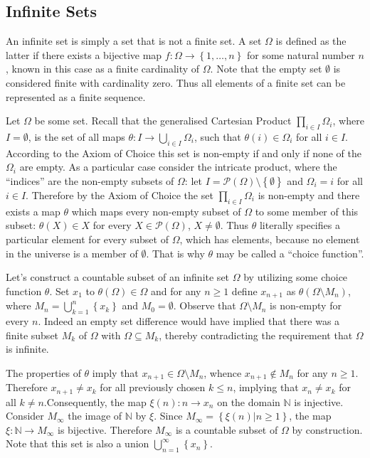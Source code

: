 \documentclass[a4paper]{article}
\newcommand{\obj}[1]{\left\{{#1}\right\}}
\newcommand{\brac}[1]{{\left({#1}\right)}}
\begin{document}


\subsection{Infinite Sets} %
\label{sub:infinite_sets}
An infinite set is simply a set that is not a finite set. A set $\Omega$ is defined as the latter if there exists a bijective map $f:\Omega\to\obj{1,\ldots, n}$ for some natural number $n$, known in this case as a finite cardinality of $\Omega$. Note that the empty set $\emptyset$ is considered finite with cardinality zero. Thus all elements of a finite set can be represented as a finite sequence.

Let $\Omega$ be some set. Recall that the generalised Cartesian Product $\prod_{i\in I}\Omega_i$, where $I=\emptyset$, is the set of all maps $\theta:I\to \bigcup_{i\in I}\Omega_i$, such that $\theta(i)\in \Omega_i$ for all $i\in I$. According to the Axiom of Choice this set is non-empty if and only if none of the $\Omega_i$ are empty. As a particular case consider the intricate product, where the ``indices'' are the non-empty subsets of $\Omega$: let $I = \mathcal{P}\brac{\Omega}\setminus\obj{\emptyset}$ and $\Omega_i=i$ for all $i\in I$. Therefore by the Axiom of Choice the set $\prod_{i\in I}\Omega_i$ is non-empty and there exists a map $\theta$ which maps every non-empty subset of $\Omega$ to some member of this subset: $\theta(X)\in X$ for every $X\in \mathcal{P}\brac{\Omega}$, $X\neq \emptyset$. Thus $\theta$ literally specifies a particular element for every subset of $\Omega$, which has elements, because no element in the universe is a member of $\emptyset$. That is why $\theta$ may be called a ``choice function''.

Let's construct a countable subset of an infinite set $\Omega$ by utilizing some choice function $\theta$. Set $x_1$ to $\theta(\Omega)\in \Omega$ and for any $n\geq 1$ define $x_{n+1}$ as $\theta(\Omega\setminus M_n)$, where $M_n = \bigcup_{k=1}^n\obj{x_k}$ and $M_0 = \emptyset$.
Observe that $\Omega\setminus M_n$ is non-empty for every $n$. Indeed an empty set difference would have implied that there was a finite subset $M_k$ of $\Omega$ with $\Omega\subseteq M_k$, thereby contradicting the requirement that $\Omega$ is infinite.

The properties of $\theta$ imply that $x_{n+1}\in \Omega\setminus M_n$, whence $x_{n+1}\notin M_n$ for any $n\geq 1$. Therefore $x_{n+1}\neq x_k$ for all previously chosen $k\leq n$, implying that $x_n\neq x_k$ for all $k\neq n$.Consequently, the map $\xi(n):n\to x_n$ on the domain $\mathbb{N}$ is injective. Consider $M_\infty$ the image of $\mathbb{N}$ by $\xi$. Since $M_\infty=\obj{ \xi(n)\vert n\geq 1}$, the map $\xi:\mathbb{N}\to M_\infty$ is bijective. Therefore $M_\infty$ is a countable subset of $\Omega$ by construction. Note that this set is also a union $\bigcup_{n=1}^{\infty}\obj{x_n}$.
\end{document}
